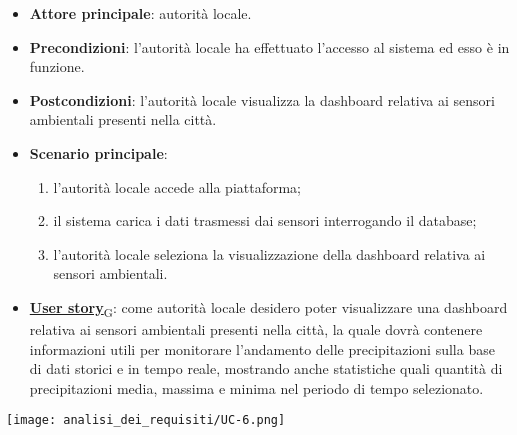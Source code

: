 \begin{itemize}
	\item \textbf{Attore principale}: autorità locale.
	\item \textbf{Precondizioni}: l'autorità locale ha effettuato l'accesso al sistema ed esso è in funzione.
	\item \textbf{Postcondizioni}: l'autorità locale visualizza la dashboard relativa
	      ai sensori ambientali presenti nella città.
	\item \textbf{Scenario principale}:
	      \begin{enumerate}
		      \item l'autorità locale accede alla piattaforma;
		      \item il sistema carica i dati trasmessi dai sensori interrogando il database;
		      \item l'autorità locale seleziona la visualizzazione della dashboard relativa ai sensori ambientali.
	      \end{enumerate}
	\item \href{https://7last.github.io/docs/pb/documentazione-interna/glossario\#user-story}{\textbf{User story}\textsubscript{G}}:
	      come autorità locale desidero poter visualizzare una dashboard relativa ai sensori ambientali presenti nella città, la quale
	      dovrà contenere informazioni utili per monitorare l'andamento delle precipitazioni sulla base di dati storici e in tempo reale, mostrando
	      anche statistiche quali quantità di precipitazioni media, massima e minima nel periodo di tempo selezionato.
\end{itemize}
\begin{center}
	\texttt{[image: analisi\_dei\_requisiti/UC-6.png]}
\end{center}


